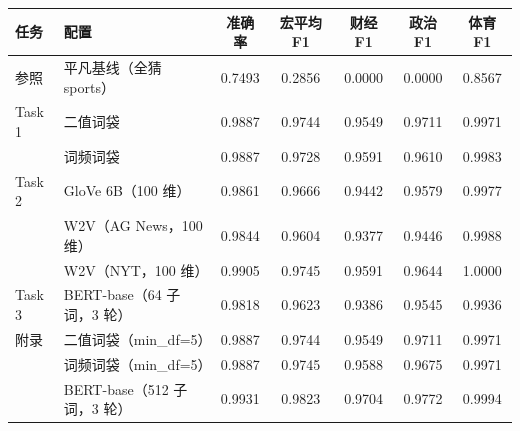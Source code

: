 \begin{tabular}{llccccc}
\toprule
任务 & 配置 & 准确率 & 宏平均 F1 & 财经 F1 & 政治 F1 & 体育 F1 \\
\midrule
参照 & 平凡基线（全猜 sports） & 0.7493 & 0.2856 & 0.0000 & 0.0000 & 0.8567 \\
\midrule
Task 1 & 二值词袋 & 0.9887 & 0.9744 & 0.9549 & 0.9711 & 0.9971 \\
 & 词频词袋 & 0.9887 & 0.9728 & 0.9591 & 0.9610 & 0.9983 \\
\midrule
Task 2 & GloVe 6B（100 维） & 0.9861 & 0.9666 & 0.9442 & 0.9579 & 0.9977 \\
 & W2V（AG News，100 维） & 0.9844 & 0.9604 & 0.9377 & 0.9446 & 0.9988 \\
 & W2V（NYT，100 维） & 0.9905 & 0.9745 & 0.9591 & 0.9644 & 1.0000 \\
\midrule
Task 3 & BERT-base（64 子词，3 轮） & 0.9818 & 0.9623 & 0.9386 & 0.9545 & 0.9936 \\
\midrule
附录 & 二值词袋（min\_df=5） & 0.9887 & 0.9744 & 0.9549 & 0.9711 & 0.9971 \\
 & 词频词袋（min\_df=5） & 0.9887 & 0.9745 & 0.9588 & 0.9675 & 0.9971 \\
 & BERT-base（512 子词，3 轮） & 0.9931 & 0.9823 & 0.9704 & 0.9772 & 0.9994 \\
\bottomrule
\end{tabular}
